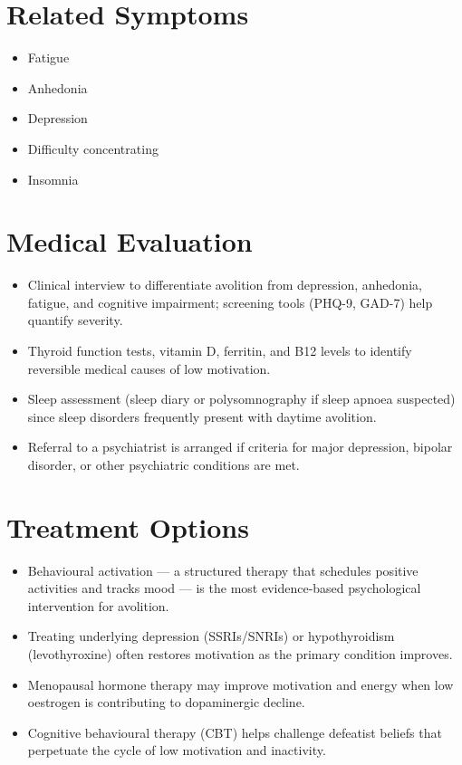 \section*{Related Symptoms}
\begin{itemize}
  \item Fatigue
  \item Anhedonia
  \item Depression
  \item Difficulty concentrating
  \item Insomnia
\end{itemize}


\section*{Medical Evaluation}
\begin{itemize}
  \item Clinical interview to differentiate avolition from depression, anhedonia, fatigue, and cognitive impairment; screening tools (PHQ-9, GAD-7) help quantify severity.
  \item Thyroid function tests, vitamin D, ferritin, and B12 levels to identify reversible medical causes of low motivation.
  \item Sleep assessment (sleep diary or polysomnography if sleep apnoea suspected) since sleep disorders frequently present with daytime avolition.
  \item Referral to a psychiatrist is arranged if criteria for major depression, bipolar disorder, or other psychiatric conditions are met.
\end{itemize}

\section*{Treatment Options}
\begin{itemize}
  \item Behavioural activation — a structured therapy that schedules positive activities and tracks mood — is the most evidence-based psychological intervention for avolition.
  \item Treating underlying depression (SSRIs/SNRIs) or hypothyroidism (levothyroxine) often restores motivation as the primary condition improves.
  \item Menopausal hormone therapy may improve motivation and energy when low oestrogen is contributing to dopaminergic decline.
  \item Cognitive behavioural therapy (CBT) helps challenge defeatist beliefs that perpetuate the cycle of low motivation and inactivity.
\end{itemize}


